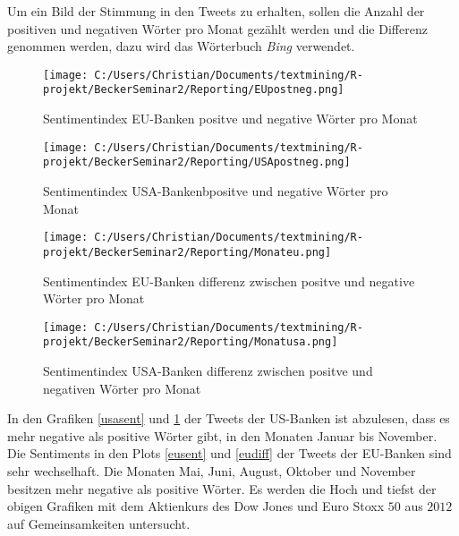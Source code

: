  Um ein Bild der Stimmung in den Tweets zu erhalten, sollen die Anzahl der positiven und negativen Wörter pro Monat gezählt werden und die Differenz genommen werden, dazu wird das Wörterbuch \textit{Bing} verwendet.
\begin{figure}[H]
	\begin{minipage}[b]{.4\linewidth} %
		\texttt{[image: C:/Users/Christian/Documents/textmining/R-projekt/BeckerSeminar2/Reporting/EUpostneg.png]}
		\caption{Sentimentindex EU-Banken positve und negative Wörter pro Monat} \label{eusent}
	\end{minipage}
	\hspace{.1\linewidth}%
	\begin{minipage}[b]{.4\linewidth} %
		\texttt{[image: C:/Users/Christian/Documents/textmining/R-projekt/BeckerSeminar2/Reporting/USApostneg.png]}
		\caption{Sentimentindex USA-Bankenbpositve und negative Wörter pro Monat}\label{usasent}
	\end{minipage}

	\begin{minipage}[b]{.4\linewidth} %
	\texttt{[image: C:/Users/Christian/Documents/textmining/R-projekt/BeckerSeminar2/Reporting/Monateu.png]}
	\caption{Sentimentindex EU-Banken differenz  zwischen positve und negative Wörter pro Monat}\label{eudiff}
\end{minipage}
	\hspace{.2\linewidth}
\begin{minipage}[b]{.4\linewidth} %
	\texttt{[image: C:/Users/Christian/Documents/textmining/R-projekt/BeckerSeminar2/Reporting/Monatusa.png]}
	\caption{Sentimentindex USA-Banken differenz  zwischen positve und negativen Wörter pro Monat}\label{usadiff}
\end{minipage}
\end{figure}
In den Grafiken \ref{usasent} und \ref{usadiff} der Tweets der US-Banken  ist abzulesen, dass es mehr negative als positive Wörter gibt, in den Monaten Januar bis November. Die Sentiments in den Plots \ref{eusent} und \ref{eudiff} der Tweets der EU-Banken sind sehr wechselhaft. Die Monaten Mai, Juni, August, Oktober und November besitzen mehr negative als positive Wörter. Es werden die Hoch und tiefst der obigen Grafiken mit dem Aktienkurs des Dow Jones und Euro Stoxx $50$ aus $2012$ auf Gemeinsamkeiten untersucht. 

